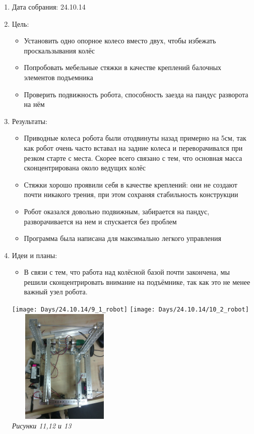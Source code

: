 
	\begin{enumerate}
		\item Дата собрания: 24.10.14
		\item Цель:
		\begin{itemize}
			\item Установить одно опорное колесо вместо двух, чтобы избежать проскальзывания колёс
			\item Попробовать мебельные стяжки в качестве креплений балочных элементов подъемника
			\item Проверить подвижность робота, способность заезда на пандус разворота на нём
		\end{itemize}			
		\item Результаты:
		\begin{itemize}
			\item Приводные колеса робота были отодвинуты назад примерно на 5см, так как робот очень часто вставал на задние колеса и переворачивался при резком старте с места. Скорее всего связано с тем, что основная масса сконцентрирована около ведущих колёс
			\item Стяжки хорошо проявили себя в качестве креплений: они не создают почти никакого трения, при этом сохраняя стабильность конструкции
			\item Робот оказался довольно подвижным, забирается на пандус, разворачивается на нем и спускается без проблем
			\item Программа была написана для максимально легкого управления
		\end{itemize}
		\item Идеи и планы:
		\begin{itemize}
			\item В связи с тем, что работа над колёсной базой почти закончена, мы решили сконцентрировать внимание на подъёмнике, так как это не менее важный узел робота.
		\end{itemize}
				\texttt{[image: Days/24.10.14/9\_1\_robot]}
				\texttt{[image: Days/24.10.14/10\_2\_robot]}
				\includegraphics[width=55mm,height=55mm]{Days/24.10.14/9_4_robot}\\
	\emph{Рисунки 11,12 и 13}
	\end{enumerate}
\fillpage
